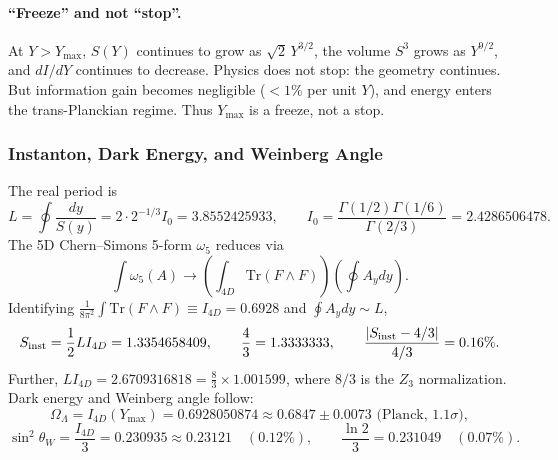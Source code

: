 \documentclass[12pt,oneside,openany]{book}
\begin{document}
\paragraph{``Freeze'' and not ``stop''.} At \(Y > Y_{\max}\), \(S(Y)\) continues to grow as \(\sqrt{2}\,Y^{3/2}\), the volume \(S^3\) grows as \(Y^{9/2}\), and \(dI/dY\) continues to decrease. Physics does not stop: the geometry continues. But information gain becomes negligible (\(<1\%\) per unit \(Y\)), and energy enters the trans-Planckian regime. Thus \(Y_{\max}\) is a freeze, not a stop.

\subsubsection{Instanton, Dark Energy, and Weinberg Angle}
\label{sssec:instanton}
The real period is
\begin{equation}
L = \oint\frac{dy}{S(y)} = 2 \cdot 2^{-1/3} I_0 = 3.8552425933, \qquad I_0 = \frac{\Gamma(1/2)\Gamma(1/6)}{\Gamma(2/3)} = 2.4286506478.
\end{equation}
The 5D Chern--Simons 5-form \(\omega_5\) reduces via
\begin{equation}
\int \omega_5(A) \to \left(\int_{4D} \mathrm{Tr}(F \wedge F)\right)\left(\oint A_y dy\right).
\end{equation}
Identifying \(\frac{1}{8\pi^2}\int \mathrm{Tr}(F \wedge F) \equiv I_{4D} = 0.6928\) and \(\oint A_y dy \sim L\),
\begin{equation}
S_{\rm inst} = \frac{1}{2} L I_{4D} = 1.3354658409, \qquad \frac{4}{3} = 1.3333333, \qquad \frac{|S_{\rm inst}-4/3|}{4/3} = 0.16\%.
\label{eq:instanton}
\end{equation}
Further, \(L I_{4D} = 2.6709316818 = \frac{8}{3} \times 1.001599\), where \(8/3\) is the \(Z_3\) normalization. Dark energy and Weinberg angle follow:
\begin{equation}
\Omega_\Lambda = I_{4D}(Y_{\max}) = 0.6928050874 \approx 0.6847 \pm 0.0073 \text{ (Planck, }1.1\sigma\text{)},
\end{equation}
\begin{equation}
\sin^2\theta_W = \frac{I_{4D}}{3} = 0.230935 \approx 0.23121 \quad (0.12\%), \qquad \frac{\ln 2}{3} = 0.231049 \quad (0.07\%).
\end{equation}

\end{document}
